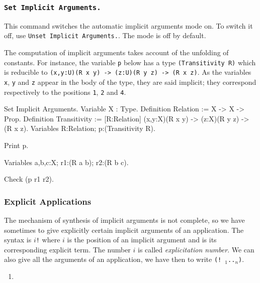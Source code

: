 {\begin{coq_example}
\subsubsection{\tt Set Implicit Arguments.}
\label{Implicit Arguments}

This command switches the automatic implicit arguments
mode on. To switch it off, use {\tt Unset Implicit Arguments.}.
The mode is off by default.

The computation of implicit arguments takes account of the
unfolding of constants.  For instance, the variable {\tt p} below has
a type {\tt (Transitivity R)} which is reducible to {\tt (x,y:U)(R x
y) -> (z:U)(R y z) -> (R x z)}. As the variables {\tt x}, {\tt y} and
{\tt z} appear in the body of the type, they are said implicit; they
correspond respectively to the positions {\tt 1}, {\tt 2} and {\tt 4}.

\begin{coq_example*}
Set Implicit Arguments.
Variable X : Type.
Definition Relation := X -> X -> Prop.
Definition Transitivity := [R:Relation]
           (x,y:X)(R x y) -> (z:X)(R y z) -> (R x z).
Variables R:Relation; p:(Transitivity R).
\end{coq_example*}
\begin{coq_example}
Print p.
\end{coq_example}
\begin{coq_example*}
Variables a,b,c:X;  r1:(R a b); r2:(R b c).
\end{coq_example*}
\begin{coq_example}
Check (p r1 r2).
\end{coq_example}

\subsubsection{Explicit Applications}

The mechanism of synthesis of implicit arguments is not complete, so
we have sometimes to give explicitly certain implicit arguments of an
application. The syntax is {\tt $i$!}{\term} where $i$ is the position
of an implicit argument and {\term} is its corresponding explicit
term. The number $i$ is called {\em explicitation number}.  We can
also give all the arguments of an application, we have then to write
{\tt (!{\ident}~{\term}$_1$..{\term}$_n$)}.

\ErrMsg
\begin{enumerate}
\item {}
\end{enumerate}


\end{coq_example}}
